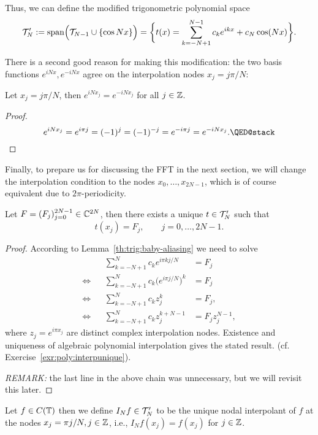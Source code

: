 Thus, we can define the modified trigonometric polynomial space
\[
  \mathcal{T}_N' := {\rm span}\Big(\mathcal{T}_{N-1} \cup \{ \cos N x \} \Big)
    =  \bigg\{ t(x) = \sum_{k = -N+1}^{N-1} c_k e^{ikx} + c_N \cos(Nx) \bigg\}.
\]

There is a second good reason for making this modification: the two
basis functions $e^{iNx}, e^{-iNx}$ agree on the interpolation nodes
$x_j = j \pi / N$:

\begin{lemma} \label{th:trig:baby-aliasing}
  Let $x_j = j \pi / N$, then $e^{iN x_j} = e^{-iNx_j}$ for all
  $j \in \mathbb{Z}$.
\end{lemma}
\begin{proof}
  \[
    e^{iNx_j} = e^{i \pi j} = (-1)^j = (-1)^{-j} = e^{-i\pi j} = e^{-iNx_j}.
    \qedhere
  \]
\end{proof}


Finally, to prepare us for discussing the FFT in the next section, we will
change the interpolation condition to the nodes $x_0, \dots, x_{2N-1}$, which is
of course equivalent due to $2\pi$-periodicity.

\begin{lemma}
  Let $F  = (F_j)_{j = 0}^{2N-1} \in \mathbb{C}^{2N}$, then there exists a unique
  $t \in \mathcal{T}_N'$ such that
  \[
    t(x_j) = F_j, \qquad j = 0, \dots, 2N-1.
  \]
\end{lemma}
\begin{proof}
  According to Lemma~\ref{th:trig:baby-aliasing} we need to solve
  \begin{align*}
      && \sum_{k = -N+1}^N c_k e^{i\pi k j/N} &= F_j \\
      \Leftrightarrow &&
      \sum_{k = -N+1}^N c_k \big(e^{i\pi j/N}\big)^k &= F_j \\
      \Leftrightarrow &&
      \sum_{k = -N+1}^N c_k z_j^k &= F_j, \\
      \Leftrightarrow &&
      \sum_{k = -N+1}^N c_k z_j^{k+N-1} &= F_j z_j^{N-1},
  \end{align*}
  where $z_j = e^{i\pi x_j}$ are distinct complex interpolation nodes. Existence
  and uniqueness of algebraic polynomial interpolation gives the stated result.
  (cf. Exercise~\ref{exr:poly:interpunique}).

  {\it REMARK: } the last line in the above chain was unnecessary, but we will
  revisit this later.
\end{proof}

\medskip

\begin{definition}
  Let $f \in C(\mathbb{T})$ then we define $I_N f \in \mathcal{T}_N'$ to be the unique nodal
  interpolant of $f$ at the nodes $x_j = \pi j / N, j \in \mathbb{Z}$, i.e., $I_N f(x_j)
  = f(x_j)$ for $j \in \mathbb{Z}$.
\end{definition}

